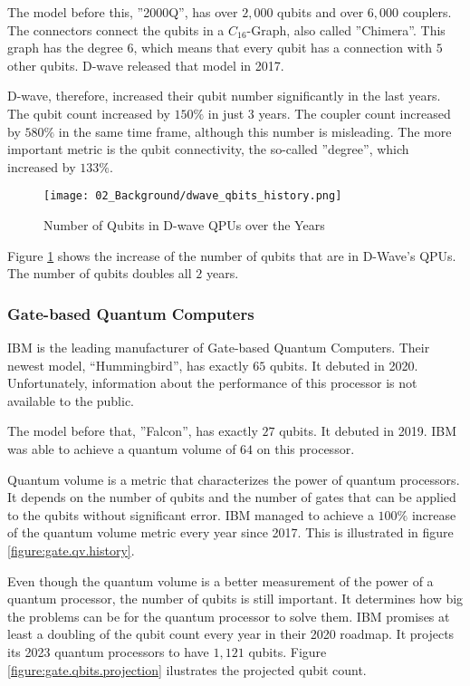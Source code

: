 The model before this, ''2000Q'', has over $2, 000$ qubits and over $6, 000$ couplers.
The connectors connect the qubits in a $C_{16}$-Graph, also called ''Chimera''.
This graph has the degree $6$, which means that every qubit has a connection with $5$ other qubits.
D-wave released that model in 2017.
\cite{D-Wave2020, Zbinden2020}

D-wave, therefore, increased their qubit number significantly in the last years.
The qubit count increased by $150\%$ in just $3$ years.
The coupler count increased by $580\%$ in the same time frame, although this number is misleading.
The more important metric is the qubit connectivity, the so-called ''degree'', which increased by $133\%$.

\begin{figure}[!ht]
  \centering
  \texttt{[image: 02\_Background/dwave\_qbits\_history.png]}
  \caption{Number of Qubits in D-wave QPUs over the Years \cite{D-Wave2018, D-Wave2020}}
  \label{figure:annealing.processors.history}
\end{figure}

Figure \ref{figure:annealing.processors.history} shows the increase of the number of qubits that are in D-Wave's QPUs.
The number of qubits doubles all $2$ years.

\subsubsection{Gate-based Quantum Computers}

IBM is the leading manufacturer of Gate-based Quantum Computers.
Their newest model, ``Hummingbird'', has exactly $65$ qubits.
It debuted in 2020.
Unfortunately, information about the performance of this processor is not available to the public.
\cite{IBMRoadmap2020}

The model before that, ''Falcon'', has exactly $27$ qubits.
It debuted in 2019.
IBM was able to achieve a quantum volume of $64$ on this processor.
\cite{IBMRoadmap2020}

Quantum volume is a metric that characterizes the power of quantum processors.
It depends on the number of qubits and the number of gates that can be applied to the qubits without significant error.
\cite{Bishop2017}
IBM managed to achieve a $100\%$ increase of the quantum volume metric every year since 2017.
\cite{IBMqv2020}
This is illustrated in figure \ref{figure:gate.qv.history}.

Even though the quantum volume is a better measurement of the power of a quantum processor, the number of qubits is still important.
It determines how big the problems can be for the quantum processor to solve them.
IBM promises at least a doubling of the qubit count every year in their 2020 roadmap.
It projects its 2023 quantum processors to have $1, 121$ qubits.
Figure \ref{figure:gate.qbits.projection} ilustrates the projected qubit count.
\cite{IBMRoadmap2020}

